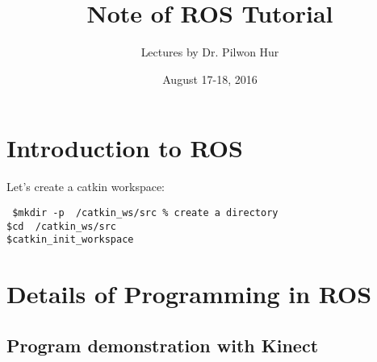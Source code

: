 \documentclass{article}
\title{Note of ROS Tutorial}
\author{Lectures by Dr. Pilwon Hur}
\date{August 17-18, 2016}
\begin{document}
\maketitle
\section{Introduction to ROS}
Let's create a catkin workspace:
\begin{shaded}
\noindent\texttt{\noindent
	\$\quad mkdir -p ~/catkin\_ws/src \quad \% create a directory\\
	 \$\quad cd ~/catkin\_ws/src\\
	 \$\quad catkin\_init\_workspace}	 
\end{shaded}








\section{Details of Programming in ROS}





\subsection{Program demonstration with Kinect}





%
\end{document}
